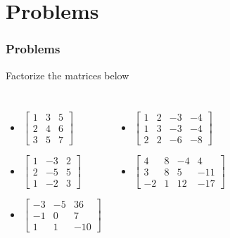 \section{Problems}
\begin{frame}
    \frametitle{Problems}

    \begin{exampleblock}{Factorize the matrices below}
    \begin{columns}[t]
    \begin{itemize}[<+|alert@+>]
        \item
            \(
            \left[
            \begin{array}{rrr}
                1&3&5\\
                2&4&6\\
                3&5&7
            \end{array}
            \right]
            \)
        \item
            \(
            \left[
            \begin{array}{rrr}
                1&-3&2\\
                2&-5&5\\
                1&-2&3
            \end{array}
            \right]
            \)
        \item
            \(
            \left[
            \begin{array}{rrr}
                -3&-5&36\\
                -1&0&7\\
                1&1&-10
            \end{array}
            \right]
            \)
    \end{itemize}
    \begin{itemize}[<+|alert@+>]
        \item
            \(
            \left[
            \begin{array}{rrrr}
                1&2&-3&-4\\
                1&3&-3&-4\\
                2&2&-6&-8
            \end{array}
            \right]
            \)
        \item
            \(
            \left[
            \begin{array}{rrrr}
                4&8&-4&4\\
                3&8&5&-11\\
                -2&1&12&-17
            \end{array}
            \right]
            \)
    \end{itemize}
    \end{columns}
    \end{exampleblock}
\end{frame}

